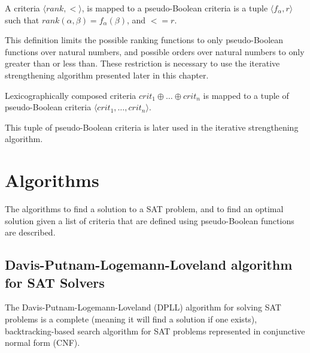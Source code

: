 \begin{defs}
A criteria $\langle rank,< \rangle$,
is mapped to a pseudo-Boolean criteria is a tuple $\langle f_{\alpha}, r \rangle$
such that $rank(\alpha,\beta) = f_{\alpha}(\beta)$, and $< = r$. 
\end{defs}

This definition limits the possible ranking functions to only pseudo-Boolean functions over natural numbers, 
and possible orders over natural numbers to only greater than or less than.
These restriction is necessary to use the iterative strengthening algorithm presented later in this chapter.

\begin{defs}
Lexicographically composed criteria $crit_1 \oplus \ldots \oplus crit_n$ is mapped to a tuple of pseudo-Boolean criteria $\langle crit_1,\ldots,crit_n\rangle$.
\end{defs}
This tuple of  pseudo-Boolean criteria is later used in the iterative strengthening algorithm.

\section{Algorithms}
\label{impl.algorithms}
The algorithms to find a solution to a SAT problem, and to find an optimal solution given a list of criteria that are defined using pseudo-Boolean functions are described.

\subsection{Davis-Putnam-Logemann-Loveland algorithm for SAT Solvers}
The Davis-Putnam-Logemann-Loveland (DPLL) algorithm \citep{Davis1960, davis1962machine} for solving SAT problems is a complete (meaning it will find a solution if one exists), 
backtracking-based search algorithm for SAT problems represented in conjunctive normal form (CNF).

